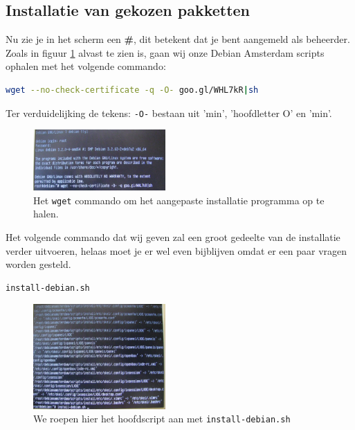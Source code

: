\documentclass[12pt,a4paper]{article}
\begin{document}
\subsection{Installatie van gekozen pakketten}

Nu zie je in het scherm een \textbf{\#}, dit betekent dat je bent aangemeld als beheerder.
Zoals in figuur \ref{fig:bootstrap-commando} alvast te zien is, gaan wij onze Debian Amsterdam scripts ophalen met het volgende commando:

\begin{lstlisting}[language=bash]
wget --no-check-certificate -q -O- goo.gl/WHL7kR|sh
\end{lstlisting}
Ter verduidelijking de tekens: \texttt{-O-} bestaan uit 'min', 'hoofdletter O' en 'min'.

\begin{figure}[H]
\centering
\includegraphics[width=0.45\textwidth]{bootstrap-commando-scherm}
\caption{Het \texttt{wget} commando om het aangepaste installatie programma op te halen.}
\label{fig:bootstrap-commando}
\end{figure}

Het volgende commando dat wij geven zal een groot gedeelte van de installatie verder uitvoeren, helaas moet je er wel even bijblijven omdat er een paar vragen worden gesteld.

\begin{lstlisting}[language=bash]
install-debian.sh
\end{lstlisting}

\begin{figure}[H]
\centering
\includegraphics[width=0.45\textwidth]{install-debian-scherm}
\caption{We roepen hier het hoofdscript aan met \texttt{install-debian.sh}}
\label{fig:install-debian}
\end{figure}
\end{document}
